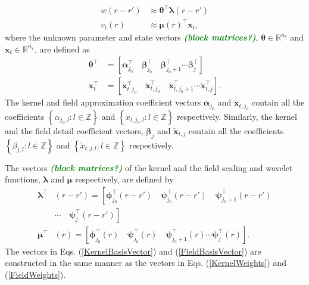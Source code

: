 \documentclass[journal,a4paper]{IEEEtran}
\newcommand{\dean}[1]{\textsf{\emph{\textbf{\textcolor{green}{#1}}}}}
\begin{document}
 \begin{align}
 w\left(r-r'\right) &\approx \boldsymbol\theta^\top\boldsymbol\lambda\left(r-r'\right) 
\label{eq:KernelFiniteExpansion} \\
 v_t\left(r\right) &\approx \boldsymbol\mu\left(r\right)^\top\mathbf{x}_t,
\label{eq:FieldFiniteExpansion}
\end{align}
where the unknown parameter and state vectors \dean{(block matrices?)}, $\boldsymbol\theta \in \mathbb{R}^{n_{\theta}}$ and $\mathbf{x}_t \in \mathbb{R}^{n_x}$, are defined as 
\begin{align}
 \boldsymbol\theta^\top &=\left[ \boldsymbol\alpha_{j_0}^\top \quad \boldsymbol\beta_{j_0}^\top \quad \boldsymbol\beta_{j_0+1}^\top \cdots \boldsymbol\beta_{j}^\top\right] 
\label{KernelWeights} \\
 \mathbf{x}_{t}^\top &=\left[\mathbf{x}_{t,j_{0}}^\top \quad  \check{\mathbf{x}}_{t,j_{0}}^\top \quad  \check{\mathbf{x}}_{t,j_{0}+1}^\top \cdots \check{\mathbf{x}}_{t,j}^\top\right].
\label{FieldWeights}
\end{align}
The kernel and field approximation coefficient vectors $\boldsymbol \alpha_{j_0}$ and $\mathbf{x}_{t,j_{0}}$ contain all the coefficients $\left\lbrace\alpha_{j_0, l}:l \in \mathbb{Z} \right\rbrace $ and $\left\lbrace x_{t,j_0, l}: l \in \mathbb{Z}\right\rbrace$ respectively. Similarly, the kernel and the field detail coefficient vectors, $\boldsymbol\beta_{j}$ and $\check{\mathbf{x}}_{t,j}$ contain all the coefficients $\left\lbrace \beta_{j,l} :l \in \mathbb{Z}\right\rbrace$ and $\left\lbrace  \check x_{t,j, l}:l \in \mathbb{Z}\right\rbrace$ respectively.

The vectors \dean{(block matrices?)} of the kernel and the field scaling and wavelet functions, $\boldsymbol\lambda$ and $\boldsymbol\mu$ respectively, are defined by
\begin{align}
 \boldsymbol\lambda^\top & (r-r')=\left[ \boldsymbol\phi_{j_0}^\top(r-r') \quad \boldsymbol\psi_{j_0}^\top(r-r') \quad \boldsymbol\psi_{j_0+1}^\top(r-r') \right. \nonumber \\
&\left. \cdots \quad \boldsymbol\psi_{j}^\top(r-r')\right] \label{KernelBasisVector} \\
 \boldsymbol\mu^\top & (r)=\left[ \boldsymbol\phi_{j_0}^\top(r) \quad \boldsymbol\psi_{j_0}^\top(r) \quad \boldsymbol\psi_{j_0+1}^\top(r) \cdots \boldsymbol\psi_{j}^\top(r) \right]. 
\label{FieldBasisVector}
\end{align}
The vectors in Eqs. (\ref{KernelBasisVector}) and (\ref{FieldBasisVector}) are constructed in the same manner as the vectors in Eqs. (\ref{KernelWeights}) and (\ref{FieldWeights}). 
\end{document}
